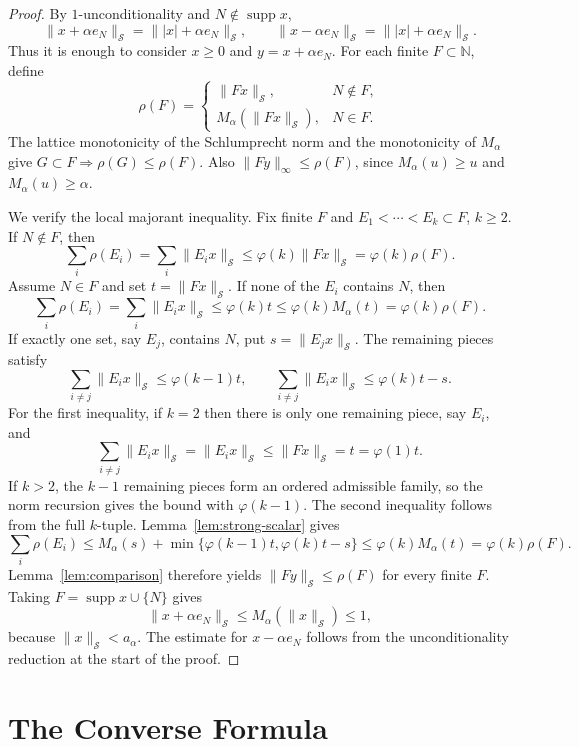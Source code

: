 \documentclass[11pt]{article}
\newcommand{\N}{\mathbb N}
\newcommand{\ph}{\varphi}
\DeclareMathOperator{\supp}{supp}
\begin{document}
\begin{proof}
By $1$-unconditionality and $N\notin\supp x$,
\[
 \|x+\alpha e_N\|_{\mathcal S}
 =
 \||x|+\alpha e_N\|_{\mathcal S},
 \qquad
 \|x-\alpha e_N\|_{\mathcal S}
 =
 \||x|+\alpha e_N\|_{\mathcal S}.
\]
Thus it is enough to consider $x\ge 0$ and $y=x+\alpha e_N$.  For each
finite $F\subset\N$, define
\[
 \rho(F)=
 \begin{cases}
  \|Fx\|_{\mathcal S},& N\notin F,\\
  M_\alpha(\|Fx\|_{\mathcal S}),& N\in F.
 \end{cases}
\]
The lattice monotonicity of the Schlumprecht norm and the monotonicity of
$M_\alpha$ give $G\subset F\Rightarrow \rho(G)\le\rho(F)$.  Also
$\|Fy\|_\infty\le\rho(F)$, since $M_\alpha(u)\ge u$ and
$M_\alpha(u)\ge\alpha$.

We verify the local majorant inequality.  Fix finite $F$ and
$E_1<\cdots<E_k\subset F$, $k\ge 2$.  If $N\notin F$, then
\[
 \sum_i\rho(E_i)=\sum_i\|E_i x\|_{\mathcal S}
 \le \ph(k)\|Fx\|_{\mathcal S}
 =\ph(k)\rho(F).
\]
Assume $N\in F$ and set $t=\|Fx\|_{\mathcal S}$.
If none of the $E_i$ contains $N$, then
\[
 \sum_i\rho(E_i)=\sum_i\|E_i x\|_{\mathcal S}
 \le \ph(k)t
 \le \ph(k)M_\alpha(t)
 =\ph(k)\rho(F).
\]
If exactly one set, say $E_j$, contains $N$, put
$s=\|E_jx\|_{\mathcal S}$.  The remaining pieces satisfy
\[
 \sum_{i\ne j}\|E_i x\|_{\mathcal S}\le \ph(k-1)t,
 \qquad
 \sum_{i\ne j}\|E_i x\|_{\mathcal S}\le \ph(k)t-s.
\]
For the first inequality, if $k=2$ then there is only one remaining piece,
say $E_i$, and
\[
 \sum_{i\ne j}\|E_i x\|_{\mathcal S}
 =
 \|E_i x\|_{\mathcal S}
 \le
 \|Fx\|_{\mathcal S}
 =
 t
 =
 \ph(1)t.
\]
If $k>2$, the $k-1$ remaining pieces form an ordered admissible family, so
the norm recursion gives the bound with $\ph(k-1)$.  The second inequality
follows from the full $k$-tuple.  Lemma~\ref{lem:strong-scalar} gives
\[
 \sum_i\rho(E_i)
 \le
 M_\alpha(s)+\min\{\ph(k-1)t,\ph(k)t-s\}
 \le
 \ph(k)M_\alpha(t)
 =
 \ph(k)\rho(F).
\]
Lemma~\ref{lem:comparison} therefore yields
$\|Fy\|_{\mathcal S}\le\rho(F)$ for every finite $F$.  Taking
$F=\supp x\cup\{N\}$ gives
\[
 \|x+\alpha e_N\|_{\mathcal S}
 \le
 M_\alpha(\|x\|_{\mathcal S})
 \le 1,
\]
because $\|x\|_{\mathcal S}<a_\alpha$.  The estimate for
$x-\alpha e_N$ follows from the unconditionality reduction at the start of
the proof.
\end{proof}

\section{The Converse Formula}
\end{document}
